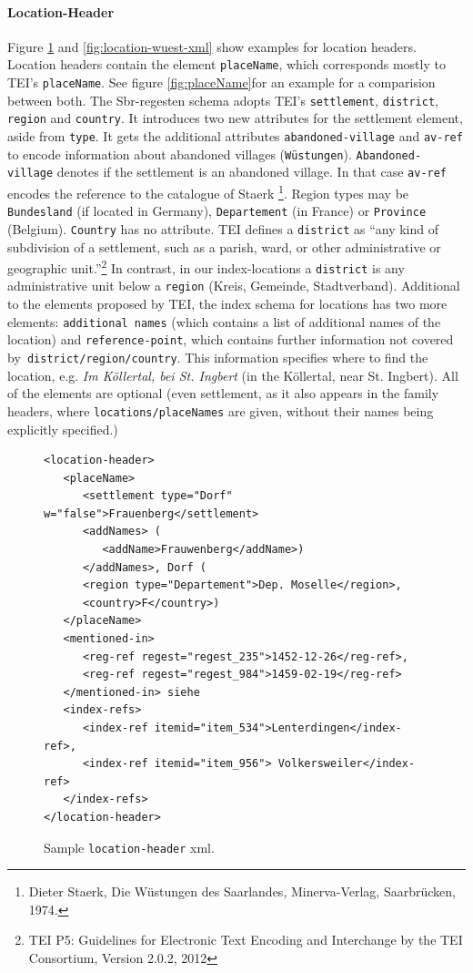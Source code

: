 \paragraph{Location-Header}
Figure \ref{fig:location-header-xml} and \ref{fig:location-wuest-xml} show examples for location headers. Location headers contain the element \texttt{placeName}, which corresponds mostly to TEI's \texttt{placeName}. See figure \ref{fig:placeName}for an example for a comparision between both. The Sbr-regesten schema adopts TEI's \texttt{settlement}, \texttt{district}, \texttt{region} and \texttt{country}. It introduces two new attributes for the settlement element, aside from \texttt{type}. It gets the additional attributes \texttt{abandoned-village} and \texttt{av-ref} to encode information about abandoned villages (\texttt{Wüstungen}). \texttt{Abandoned-village} denotes if the settlement is an abandoned village. In that case \texttt{av-ref} encodes the reference to the catalogue of Staerk \footnote{Dieter Staerk, Die Wüstungen des Saarlandes, Minerva-Verlag, Saarbrücken, 1974.}. Region types may be \texttt{Bundesland} (if located in Germany), \texttt{Departement} (in France) or \texttt{Province} (Belgium). \texttt{Country} has no attribute. TEI defines a \texttt{district} as “any kind of subdivision of a settlement, such as a parish, ward, or other administrative or geographic unit.”\footnote{TEI P5: Guidelines for Electronic Text Encoding and Interchange by the TEI Consortium, Version 2.0.2, 2012} In contrast, in our index-locations a \texttt{district} is any administrative unit below a \texttt{region} (Kreis, Gemeinde, Stadtverband).
Additional to the elements proposed by TEI, the index schema for locations has two more elements: \texttt{additional names} (which contains a list of additional names of the location) and \texttt{reference-point}, which contains further information not covered by\texttt{ district/region/country}. This information specifies where to find the location, e.g. \textit{Im Köllertal, bei St. Ingbert} (in the Köllertal, near St. Ingbert). All of the elements are optional (even settlement, as it also appears in the family headers, where \texttt{locations/placeNames} are given, without their names being explicitly specified.)   

\begin{figure}[H]
\begin{verbatim}
<location-header>
   <placeName>
      <settlement type="Dorf" w="false">Frauenberg</settlement>
      <addNames> (
         <addName>Frauwenberg</addName>)
      </addNames>, Dorf (
      <region type="Departement">Dep. Moselle</region>, 
      <country>F</country>) 
   </placeName>
   <mentioned-in>
      <reg-ref regest="regest_235">1452-12-26</reg-ref>, 
      <reg-ref regest="regest_984">1459-02-19</reg-ref>
   </mentioned-in> siehe 
   <index-refs>
      <index-ref itemid="item_534">Lenterdingen</index-ref>,
      <index-ref itemid="item_956"> Volkersweiler</index-ref>
   </index-refs>
</location-header>
\end{verbatim}
\label{fig:location-header-xml}
\caption{Sample \texttt{location-header} xml.}
\end{figure}

